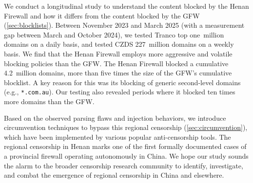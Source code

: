 \documentclass[conference,compsoc]{IEEEtran}
\begin{document}
We conduct a longitudinal study to understand the content blocked by the Henan
Firewall and how it differs from the content blocked by the GFW
(\autoref{sec:blocklists}).  Between November 2023 and March 2025 (with a
measurement gap between March and October 2024), we tested Tranco top
one~million domains on a daily basis, and tested CZDS 227~million domains on a
weekly basis.
We find that the Henan Firewall employs more aggressive and volatile blocking
policies than the GFW.  The Henan Firewall blocked a cumulative 4.2~million
domains, more than five times the size of the GFW's cumulative blocklist.  A key
reason for this was its blocking of generic second-level domains (e.g.,
\texttt{*.com.au}).  Our testing also revealed periods where it blocked ten
times more domains than the GFW\@.


Based on the observed parsing flaws and injection behaviors, we introduce
circumvention techniques to bypass this regional censorship
(\autoref{sec:circumvention}), which have been implemented by various popular
anti-censorship tools.  The regional censorship in Henan marks one of the first
formally documented cases of a provincial firewall operating autonomously in
China.  We hope our study sounds the alarm to the broader censorship research
community to identify, investigate, and combat the emergence of regional
censorship in China and elsewhere.



\end{document}

